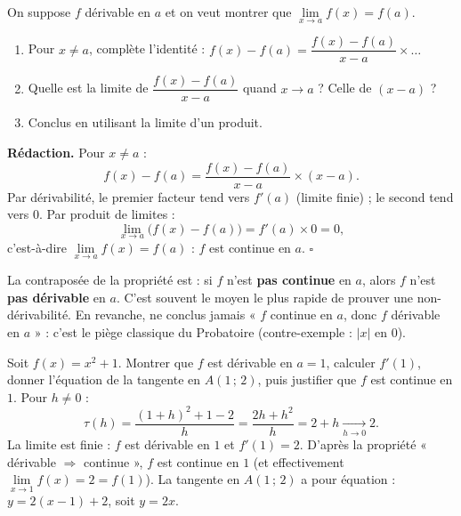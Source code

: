 \documentclass[11pt]{article}
\begin{document}
\begin{experience}
On suppose $f$ dérivable en $a$ et on veut montrer que $\lim\limits_{x\to a}f(x)=f(a)$.
\begin{enumerate}
\item Pour $x\neq a$, complète l'identité : $f(x)-f(a)=\dfrac{f(x)-f(a)}{x-a}\times \ldots$
\item Quelle est la limite de $\dfrac{f(x)-f(a)}{x-a}$ quand $x\to a$ ? Celle de $(x-a)$ ?
\item Conclus en utilisant la limite d'un produit.
\end{enumerate}
\textbf{Rédaction.} Pour $x\neq a$ :
\[ f(x)-f(a)=\frac{f(x)-f(a)}{x-a}\times (x-a). \]
Par dérivabilité, le premier facteur tend vers $f'(a)$ (limite finie) ; le second tend vers $0$. Par produit de limites :
\[ \lim_{x\to a}\bigl(f(x)-f(a)\bigr)=f'(a)\times 0=0, \]
c'est-à-dire $\lim\limits_{x\to a}f(x)=f(a)$ : $f$ est continue en $a$. $\square$
\end{experience}

\begin{attention}
La contraposée de la propriété est : si $f$ n'est \textbf{pas continue} en $a$, alors $f$ n'est \textbf{pas dérivable} en $a$. C'est souvent le moyen le plus rapide de prouver une non-dérivabilité. En revanche, ne conclus jamais « $f$ continue en $a$, donc $f$ dérivable en $a$ » : c'est le piège classique du Probatoire (contre-exemple : $|x|$ en $0$).
\end{attention}

\begin{exoresolu}
Soit $f(x)=x^2+1$. Montrer que $f$ est dérivable en $a=1$, calculer $f'(1)$, donner l'équation de la tangente en $A(1\,;\,2)$, puis justifier que $f$ est continue en $1$.
\tcblower
Pour $h\neq 0$ :
\[ \tau(h)=\frac{(1+h)^2+1-2}{h}=\frac{2h+h^2}{h}=2+h \xrightarrow[h\to 0]{} 2. \]
La limite est finie : $f$ est dérivable en $1$ et $f'(1)=2$.
D'après la propriété « dérivable $\Rightarrow$ continue », $f$ est continue en $1$ (et effectivement $\lim\limits_{x\to 1}f(x)=2=f(1)$).
La tangente en $A(1\,;\,2)$ a pour équation : $y = 2(x-1) + 2$, soit $y = 2x$.
\end{exoresolu}
\end{document}
